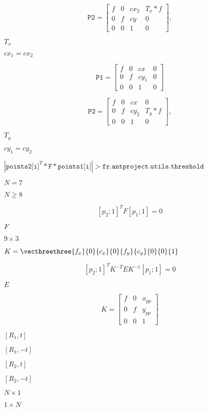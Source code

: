 \documentclass{article}
\begin{document}
\[\texttt{P2} = \begin{bmatrix} f & 0 & cx_2 & T_x*f \\ 0 & f & cy & 0 \\ 0 & 0 & 1 & 0 \end{bmatrix} ,\]
\pagebreak

$T_x$
\pagebreak

$cx_1=cx_2$
\pagebreak

\[\texttt{P1} = \begin{bmatrix} f & 0 & cx & 0 \\ 0 & f & cy_1 & 0 \\ 0 & 0 & 1 & 0 \end{bmatrix}\]
\pagebreak

\[\texttt{P2} = \begin{bmatrix} f & 0 & cx & 0 \\ 0 & f & cy_2 & T_y*f \\ 0 & 0 & 1 & 0 \end{bmatrix} ,\]
\pagebreak

$T_y$
\pagebreak

$cy_1=cy_2$
\pagebreak

$|\texttt{points2[i]}^T*\texttt{F}*\texttt{points1[i]}|>\texttt{fr.antproject.utils.threshold}$
\pagebreak

$N = 7$
\pagebreak

$N \ge 8$
\pagebreak

\[[p_2; 1]^T F [p_1; 1] = 0\]
\pagebreak

$F$
\pagebreak

$9 \times 3$
\pagebreak

$K = \vecthreethree{f_x}{0}{c_x}{0}{f_y}{c_y}{0}{0}{1}$
\pagebreak

\[[p_2; 1]^T K^{-T} E K^{-1} [p_1; 1] = 0\]
\pagebreak

$E$
\pagebreak

\[K = \begin{bmatrix} f & 0 & x_{pp} \\ 0 & f & y_{pp} \\ 0 & 0 & 1 \end{bmatrix}\]
\pagebreak

$[R_1, t]$
\pagebreak

$[R_1, -t]$
\pagebreak

$[R_2, t]$
\pagebreak

$[R_2, -t]$
\pagebreak

$N \times 1$
\pagebreak

$1 \times N$
\pagebreak
\end{document}
